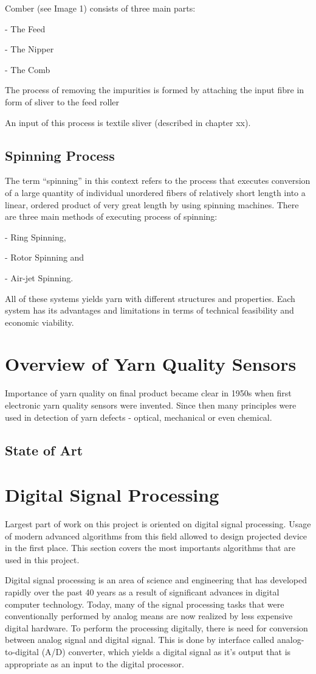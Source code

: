\documentclass[twoside]{ctuthesis}
\theoremstyle{plain}
\theoremstyle{definition}
\theoremstyle{note}
\begin{document}
Comber (see Image 1) consists of three main parts: 

- The Feed

- The Nipper

- The Comb

The process of removing the impurities is formed by attaching the input fibre in form of sliver to the feed roller

An input of this process is textile sliver (described in chapter xx).
\subsection{Spinning Process}
The term “spinning” in this context refers to the process that executes conversion of a large quantity of individual unordered fibers of relatively short length into a linear, ordered product of very great length by using spinning machines. There are three main methods of executing process of spinning:

- Ring Spinning,

- Rotor Spinning and

- Air-jet Spinning.

All of these systems yields yarn with different structures and properties. Each system has its advantages and limitations in terms of technical feasibility and economic viability.
\section{Overview of Yarn Quality Sensors}
Importance of yarn quality on final product became clear in 1950s when first electronic yarn quality sensors were invented. Since then many principles were used in detection of yarn defects - optical, mechanical or even chemical. \cite{cite:1} 
\subsection{State of Art}

\section{Digital Signal Processing}
Largest part of work on this project is oriented on digital signal processing. Usage of modern advanced algorithms from this field allowed to design projected device in the first place. This section covers the most importants algorithms that are used in this project.
	
	Digital signal processing is an area of science and engineering that has developed rapidly over the past 40 years as a result of significant advances in digital computer technology. Today, many of the signal processing tasks that were conventionally performed by analog means are now realized by less expensive digital hardware.
	\cite{cite:2}
	To perform the processing digitally, there is need for conversion between analog signal and digital signal. This is done by interface called analog-to-digital (A/D) converter, which yields a digital signal as it's output that is appropriate as an input to the digital processor.
	\cite{cite:2,cite:3}
\end{document}
